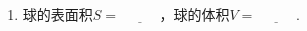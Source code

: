 \documentclass{article}
\newif\ifte
\begin{document}
\begin{multicols}{2}
\begin{enumerate}[leftmargin=20pt]
\item 球的表面积$ S=\underline{\ \ifte 4\pi R^2
\else \hspace{1cm} \fi\ } $，球的体积$ V=\underline{\ 
\ifte \dfrac{4}{3}\pi R^3\else \hspace{1cm} \fi\ } $.



\end{enumerate}
\end{multicols}   
\end{document}
